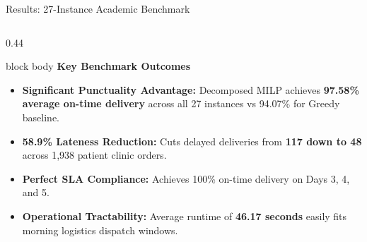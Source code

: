 \documentclass[aspectratio=169,10pt]{beamer}
\begin{document}
\begin{frame}{Results: 27-Instance Academic Benchmark}
\begin{columns}[T,totalwidth=\textwidth]
    \begin{column}{0.44\textwidth}
        \begin{beamercolorbox}[rounded=true,shadow=false,wd=\linewidth,sep=3.5pt]{block body}
            \textbf{\color{Primary}\scriptsize Key Benchmark Outcomes}
            \vspace{0.03cm}
            \scriptsize
            \begin{itemize}
                \setlength{\itemsep}{2pt}
                \item \textbf{Significant Punctuality Advantage:} Decomposed MILP achieves \textbf{97.58\% average on-time delivery} across all 27 instances vs 94.07\% for Greedy baseline.
                \item \textbf{58.9\% Lateness Reduction:} Cuts delayed deliveries from \textbf{117 down to 48} across 1,938 patient clinic orders.
                \item \textbf{Perfect SLA Compliance:} Achieves 100\% on-time delivery on Days 3, 4, and 5.
                \item \textbf{Operational Tractability:} Average runtime of \textbf{46.17 seconds} easily fits morning logistics dispatch windows.
            \end{itemize}
        \end{beamercolorbox}
    \end{column}

\end{columns}
\end{frame}

\end{document}
